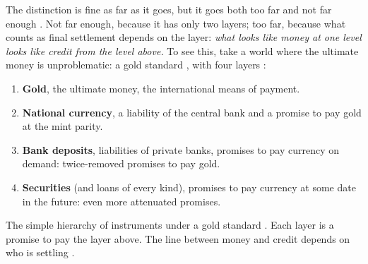 \begin{paracol}{2}
The distinction is fine as far as it goes, but it goes both too far and not far enough . Not far
enough, because it has only two layers; too far, because what counts as final settlement depends on the layer:
\emph{what looks like money at one level looks like credit from the level above.} To see this, take a world where
the ultimate money is unproblematic: a gold standard , with four layers
:
\begin{enumerate}
  \item \textbf{Gold}, the ultimate money, the international means of payment.
  \item \textbf{National currency}, a liability of the central bank and a promise to pay gold at the mint parity.
  \item \textbf{Bank deposits}, liabilities of private banks, promises to pay currency on demand: twice-removed
        promises to pay gold.
  \item \textbf{Securities} (and loans of every kind), promises to pay currency at some date in the future: even
        more attenuated promises.
\end{enumerate}

\begin{nfigure}
\caption{The simple hierarchy of instruments under a gold standard . Each layer is a promise to pay the
layer above. The line between money and credit depends on who is settling .}\label{fig:nh-instruments}
\end{nfigure}


\end{paracol}
